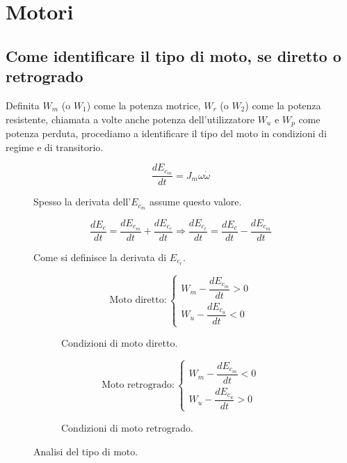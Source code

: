 \documentclass[main.tex]{subfiles}
\begin{document}
\section{Motori}

\subsection{Come identificare il tipo di moto, se diretto o retrogrado}

Definita $W_m$ (o $W_1$) come la potenza motrice, $W_r$ (o $W_2$) come la potenza resistente, chiamata a volte anche potenza dell'utilizzatore $W_u$ e $W_p$ come potenza perduta, procediamo a identificare il tipo del moto in condizioni di regime e di transitorio.

\begin{figure}[H]
	\[
		\dfrac{dE_{c_m}}{dt} = J_m\omega\dot{\omega}
	\]
	\caption{Spesso la derivata dell'$E_{c_m}$ assume questo valore.}
\end{figure}

\begin{figure}[H]
\[
	\dfrac{dE_c}{dt} = \dfrac{dE_{c_m}}{dt} + \dfrac{dE_{c_r}}{dt}
	\Longrightarrow
	\dfrac{dE_{c_r}}{dt} = \dfrac{dE_c}{dt} - \dfrac{dE_{c_m}}{dt} 
\]
\caption{Come si definisce la derivata di $E_{c_r}$.}
\end{figure}

\begin{figure}[H]
  \begin{subfigure}[b]{.5\textwidth}
  \centering
  \[
	\text{Moto diretto}: \begin{cases}
		W_m - \dfrac{dE_{c_m}}{dt} > 0 \\
		W_u - \dfrac{dE_{c_u}}{dt} < 0
	\end{cases}  
  \]
  \caption{Condizioni di moto diretto.}
  \end{subfigure}
  \hfill
  \begin{subfigure}[b]{.5\textwidth}
  \centering
  \[
	\text{Moto retrogrado}: \begin{cases}
		W_m - \dfrac{dE_{c_m}}{dt} < 0 \\
		W_u - \dfrac{dE_{c_u}}{dt} > 0
	\end{cases}    
  \]
  \caption{Condizioni di moto retrogrado.}
  \end{subfigure}
  \caption{Analisi del tipo di moto.}
\end{figure}
\end{document}
